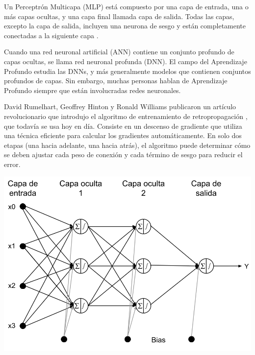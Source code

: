 Un Perceptrón Multicapa (MLP) está compuesto por una capa de entrada, una o más capas ocultas, y una capa final llamada capa de salida. Todas las capas, excepto la capa de salida, incluyen una neurona de sesgo y están completamente conectadas a la siguiente capa \citep{geron2022hands}.

\begin{minipage}{0.54\textwidth}
Cuando una red neuronal artificial (ANN) contiene un conjunto profundo de capas ocultas, se llama red neuronal profunda (DNN). El campo del Aprendizaje Profundo estudia las DNNs, y más generalmente modelos que contienen conjuntos profundos de capas. Sin embargo, muchas personas hablan de Aprendizaje Profundo siempre que están involucradas redes neuronales.

\bigskip

David Rumelhart, Geoffrey Hinton y Ronald Williams publicaron un artículo revolucionario que introdujo el algoritmo de entrenamiento de retropropagación \citep{rumelhart1986learning} , que todavía se usa hoy en día. Consiste en un descenso de gradiente que utiliza una técnica eficiente para calcular los gradientes automáticamente. En solo dos etapas (una hacia adelante, una hacia atrás), el algoritmo puede determinar cómo se deben ajustar cada peso de conexión y cada término de sesgo para reducir el error. 
\end{minipage}
\begin{minipage}{0.05\textwidth}
\textbf{ }
\end{minipage}
\begin{minipage}{0.4\textwidth}
	\includegraphics[width=1.1\textwidth]{img/multicapa}
	\label{fig:mlp_architecture}
\end{minipage}

